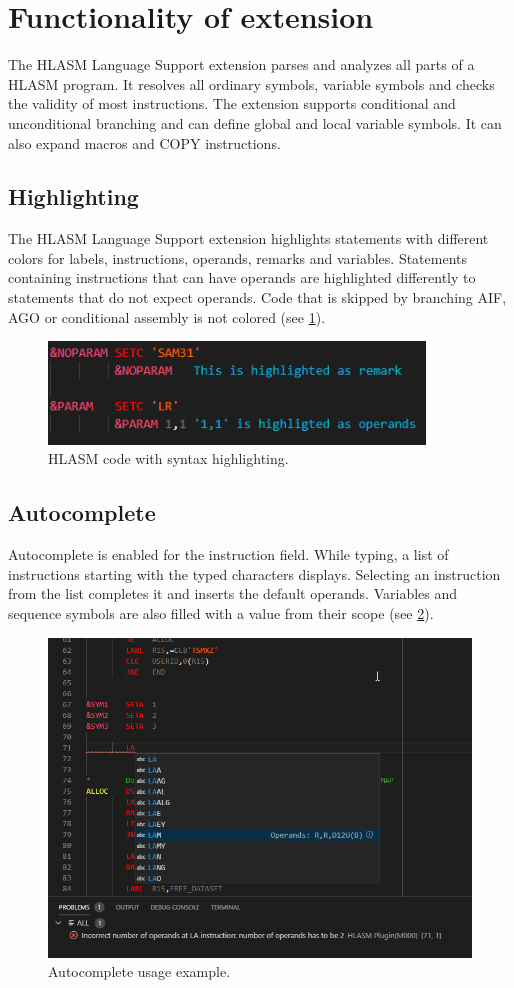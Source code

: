 \section{Functionality of extension}
\label{sec:features}
The HLASM Language Support extension parses and analyzes all parts of a HLASM program. It resolves all ordinary symbols, variable symbols and checks the validity of most instructions. The extension supports conditional and unconditional branching and can define global and local variable symbols. It can also expand macros and COPY instructions.

\subsection{Highlighting}
The HLASM Language Support extension highlights statements with different colors for labels, instructions, operands, remarks and variables. Statements containing instructions that can have operands are highlighted differently to statements that do not expect operands. Code that is skipped by branching AIF, AGO or conditional assembly is not colored (see \cref{fig:high}).

\begin{figure}[p]
	\centering
	\includegraphics[width=10cm]{img/highligting}
	\caption{HLASM code with syntax highlighting.}
	\label{fig:high}
\end{figure}

\subsection{Autocomplete}
Autocomplete is enabled for the instruction field. While typing, a list of instructions starting with the typed characters displays. Selecting an instruction from the list completes it and inserts the default operands. Variables and sequence symbols are also filled with a value from their scope (see \cref{fig:auto}).

\begin{figure}[p]
	\centering
	\includegraphics[width=0.75\linewidth]{img/autocomplete/autocomplete-32}
	\caption{Autocomplete usage example.}
	\label{fig:auto}
\end{figure}

